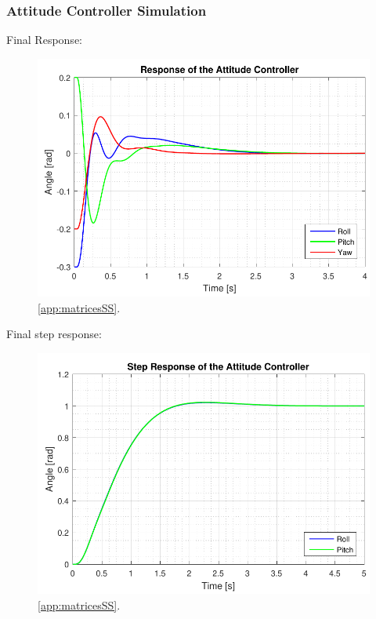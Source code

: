 \subsubsection{Attitude Controller Simulation}
Final Response:

\begin{figure}[H]
	\centering
	\includegraphics[scale=0.8]{figures/ssFinalEq.pdf}
	\caption{ \autoref{app:matricesSS}.}
	\label{fig:ssFinalEq}
\end{figure}

Final step response:

\begin{figure}[H]
	\centering
	\includegraphics[scale=0.8]{figures/ssFinalStep.pdf}
	\caption{\autoref{app:matricesSS}.}
	\label{fig:ssFinalStep}
\end{figure}


